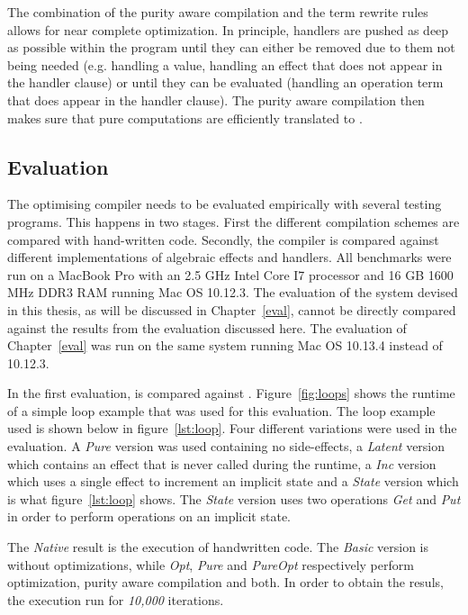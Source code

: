 The combination of the purity aware compilation and the term rewrite rules allows for near complete optimization. In principle, handlers are pushed as deep as possible within the program until they can either be removed due to them not being needed (e.g. handling a value, handling an effect that does not appear in the handler clause) or until they can be evaluated (handling an operation term that does appear in the handler clause). The purity aware compilation then makes sure that pure computations are efficiently translated to \ocaml.

\subsection{Evaluation}
The optimising compiler needs to be evaluated empirically with several testing programs. This happens in two stages. First the different compilation schemes are compared with hand-written \ocaml code. Secondly, the compiler is compared against different implementations of algebraic effects and handlers. All benchmarks were run on a MacBook Pro with an 2.5 GHz Intel Core I7 processor and 16 GB 1600 MHz DDR3 RAM running Mac OS 10.12.3. The evaluation of the system devised in this thesis, as will be discussed in Chapter~\ref{eval}, cannot be directly compared against the results from the evaluation discussed here. The evaluation of Chapter~\ref{eval} was run on the same system running Mac OS 10.13.4 instead of 10.12.3.

In the first evaluation, \eff is compared against \ocaml. Figure~\ref{fig:loops} shows the runtime of a simple loop example that was used for this evaluation. The loop example used is shown below in figure~\ref{lst:loop}. Four different variations were used in the evaluation. A \textit{Pure} version was used containing no side-effects, a \textit{Latent} version which contains an effect that is never called during the runtime, a \textit{Inc} version which uses a single effect to increment an implicit state and a \textit{State} version which is what figure~\ref{lst:loop} shows. The \textit{State} version uses two operations \textit{Get} and \textit{Put} in order to perform operations on an implicit state. 

The \textit{Native} result is the execution of handwritten \ocaml code. The \textit{Basic} version is \eff without optimizations, while \textit{Opt}, \textit{Pure} and \textit{PureOpt} respectively perform optimization, purity aware compilation and both. In order to obtain the resuls, the execution run for \textit{10,000} iterations.

